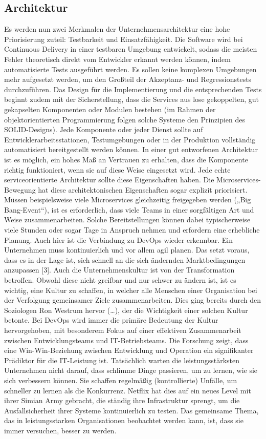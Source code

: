 \subsection{Architektur}
Es werden nun zwei Merkmalen der Unternehmensarchitektur eine hohe Priorisierung zuteil: Testbarkeit und Einsatzfähigkeit. Die Software wird bei Continuous Delivery in einer testbaren Umgebung entwickelt, sodass die meisten Fehler theoretisch direkt vom Entwickler erkannt werden können, indem automatisierte Tests ausgeführt werden. Es sollen keine komplexen Umgebungen mehr aufgesetzt werden, um den Großteil der Akzeptanz- und Regressionstests durchzuführen. Das Design für die Implementierung und die entsprechenden Tests beginnt zudem mit der Sicherstellung, dass die Services aus lose gekoppelten, gut gekapselten Komponenten oder Modulen bestehen (im Rahmen der objektorientierten Programmierung folgen solche Systeme den Prinzipien des SOLID-Designs). Jede Komponente oder jeder Dienst sollte auf Entwicklerarbeitsstationen, Testumgebungen oder in der Produktion vollständig automatisiert bereitgestellt werden können. In einer gut entworfenen Architektur ist es möglich, ein hohes Maß an Vertrauen zu erhalten, dass die Komponente richtig funktioniert, wenn sie auf diese Weise eingesetzt wird. Jede echte serviceorientierte Architektur sollte diese Eigenschaften haben. Die Microservices-Bewegung hat diese architektonischen Eigenschaften sogar explizit priorisiert. Müssen beispielsweise viele Microservices gleichzeitig freigegeben werden („Big Bang-Event“), ist es erforderlich, dass viele Teams in einer sorgfältigen Art und Weise zusammenarbeiten. Solche Bereitstellungen können dabei typischerweise viele Stunden oder sogar Tage in Anspruch nehmen und erfordern eine erhebliche Planung. Auch hier ist die Verbindung zu DevOps wieder erkennbar. Ein Unternehmen muss kontinuierlich und vor allem agil planen. Das setzt voraus, dass es in der Lage ist, sich schnell an die sich ändernden Marktbedingungen anzupassen [3]. 
Auch die Unternehmenskultur ist von der Transformation betroffen. Obwohl diese nicht greifbar und nur schwer zu ändern ist, ist es wichtig, eine Kultur zu schaffen, in welcher alle Menschen einer Organisation bei der Verfolgung gemeinsamer Ziele zusammenarbeiten. Dies ging bereits durch den Soziologen Ron Westrum hervor (…), der die Wichtigkeit einer solchen Kultur betonte.
Bei DevOps wird immer die primäre Bedeutung der Kultur hervorgehoben, mit besonderem Fokus auf einer effektiven Zusammenarbeit zwischen Entwicklungsteams und IT-Betriebsteams. Die Forschung zeigt, dass eine Win-Win-Beziehung zwischen Entwicklung und Operation ein signifikanter Prädiktor für die IT-Leistung ist. 
Tatsächlich warten die leistungsstärksten Unternehmen nicht darauf, dass schlimme Dinge passieren, um zu lernen, wie sie sich verbessern können. Sie schaffen regelmäßig (kontrollierte) Unfälle, um schneller zu lernen als die Konkurrenz. Netflix hat dies auf ein neues Level mit ihrer Simian Army gebracht, die ständig ihre Infrastruktur sprengt, um die Ausfallsicherheit ihrer Systeme kontinuierlich zu testen.
Das gemeinsame Thema, das in leistungsstarken Organisationen beobachtet werden kann, ist, dass sie immer versuchen, besser zu werden. 

